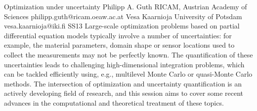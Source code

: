 \documentclass[12pt,a4paper,figuresright]{book}
\begin{document}



\clearpage

\begin{session}
    {Optimization under uncertainty}%
    {Philipp A. Guth}%
    {RICAM, Austrian Academy of Sciences}%
    {philipp.guth@ricam.oeaw.ac.at}%
    {Vesa Kaarnioja}%
    {University of Potsdam}%
    {vesa.kaarnioja@iki.fi}%
    {SS13}%
    {}%
  Large-scale optimization problems based on partial differential equation models typically involve a number of uncertainties: for example, the material parameters, domain shape or sensor locations used to collect the measurements may not be perfectly known. The quantification of these uncertainties leads to challenging high-dimensional integration problems, which can be tackled efficiently using, e.g., multilevel Monte Carlo or quasi-Monte Carlo methods. The intersection of optimization and uncertainty quantification is an actively developing field of research, and this session aims to cover some recent advances in the computational and theoretical treatment of these topics.
 \end{session}




\clearpage
\end{document}
